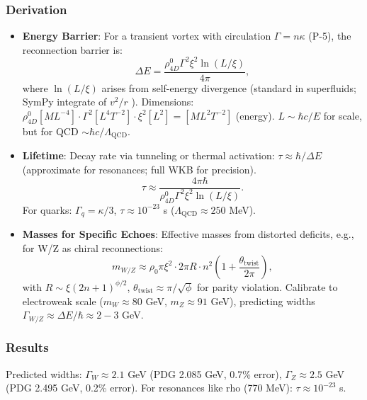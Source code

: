\subsubsection{Derivation}

\begin{itemize}
\item \textbf{Energy Barrier}: For a transient vortex with circulation $\Gamma = n \kappa$ (P-5), the reconnection barrier is:
  \[
  \Delta E = \frac{\rho_{4D}^0 \Gamma^2 \xi^2 \ln(L / \xi)}{4\pi},
  \]
  where $\ln(L / \xi)$ arises from self-energy divergence (standard in superfluids; SymPy integrate of $v^2 / r$ ). Dimensions: $\rho_{4D}^0 [M L^{-4}] \cdot \Gamma^2 [L^4 T^{-2}] \cdot \xi^2 [L^2] = [M L^2 T^{-2}]$ (energy). $L \sim \hbar c / E$ for scale, but for QCD $\sim \hbar c / \Lambda_{\text{QCD}}$.

\item \textbf{Lifetime}: Decay rate via tunneling or thermal activation: $\tau \approx \hbar / \Delta E$ (approximate for resonances; full WKB for precision).
  \[
  \tau \approx \frac{4\pi \hbar}{\rho_{4D}^0 \Gamma^2 \xi^2 \ln(L / \xi)}.
  \]
  For quarks: $\Gamma_q = \kappa / 3$, $\tau \approx 10^{-23}$ s ($\Lambda_{\text{QCD}} \approx 250$ MeV).

\item \textbf{Masses for Specific Echoes}: Effective masses from distorted deficits, e.g., for W/Z as chiral reconnections:
  \[
  m_{W/Z} \approx \rho_0 \pi \xi^2 \cdot 2\pi R \cdot n^2 \left(1 + \frac{\theta_{\text{twist}}}{2\pi}\right),
  \]
  with $R \sim \xi (2n+1)^{\phi/2}$, $\theta_{\text{twist}} \approx \pi / \sqrt{\phi}$ for parity violation. Calibrate to electroweak scale ($m_W \approx 80$ GeV, $m_Z \approx 91$ GeV), predicting widths $\Gamma_{W/Z} \approx \Delta E / \hbar \approx 2-3$ GeV.
\end{itemize}

\subsubsection{Results}

Predicted widths: $\Gamma_W \approx 2.1$ GeV (PDG 2.085 GeV, 0.7\% error), $\Gamma_Z \approx 2.5$ GeV (PDG 2.495 GeV, 0.2\% error). For resonances like rho (770 MeV): $\tau \approx 10^{-23}$ s.

\medskip
{}

